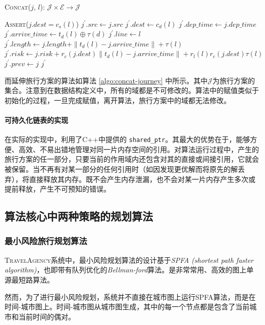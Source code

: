\begin{algorithm}[t]
\caption{\textsc{Concat}($j$, $l$): $\mathcal J \times \mathcal E \rightarrow \mathcal J$}
\label{algo:concat-journey}
\textsc{Assert}($j.dest = c_s(l)$)\;
$j^\prime.src \gets j.src$\;
$j^\prime.dest \gets c_d(l)$\;
$j^\prime.dep\_time \gets  j.dep\_time$\;
$j^\prime.arrive\_time \gets t_d(l) \oplus \tau(d)$
$j^\prime.line \gets l$\;
$j^\prime.length \gets j.length + \| t_d(l) - j.arrive\_time \| + \tau(l)$\;
$j^\prime.risk \gets j.risk + r_c(j.dest)\| t_d(l) - j.arrive\_time \| + r_l(l) r_c(j.dest) \tau(l)$\;
$j^\prime.prev \gets j$\;
\Return $j^\prime$\;
\end{algorithm}

而延伸旅行方案的算法如算法 \ref{algo:concat-journey} 中所示。其中$\mathcal J$为旅行方案的集合。注意到在数据结构定义中，所有的域都是不可修改的。算法中的赋值类似于初始化的过程，一旦完成赋值，离开算法，旅行方案中的域都无法修改。

\paragraph{可持久化链表的实现}

在实际的实现中，利用了C++中提供的 \lstinline{shared_ptr}。其最大的优势在于，能够方便、高效、不易出错地管理对同一片内存空间的引用。对算法运行过程中，产生的旅行方案的任一部分，只要当前的作用域内还包含对其的直接或间接引用，它就会被保留。当不再有对某一部分的任何引用时（如因发现更优解而将原先的解丢弃），将直接释放其内存。既不会产生内存泄漏，也不会对某一片内存产生多次或提前释放，产生不可预知的错误。

\subsection{算法核心中两种策略的规划算法}

\subsubsection{最小风险旅行规划算法}

\textsc{TravelAgency}系统中，最小风险规划算法的设计基于\emph{SPFA (shortest path faster algorithm)}，也即带有队列优化的\emph{Bellman-ford}算法。是非常常用、高效的图上单源最短路算法。

然而，为了进行最小风险规划，系统并不直接在城市图上运行SPFA算法，而是在时间-城市图上。时间-城市图从城市图生成，其中的每一个节点都是包含了当前城市和当前时间的偶对。

